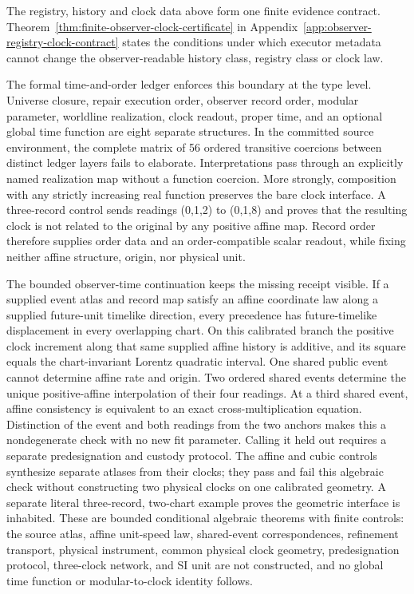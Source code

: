 \documentclass[11pt]{article}
\begin{document}
The registry, history and clock data above form one finite evidence contract.
Theorem~\ref{thm:finite-observer-clock-certificate} in
Appendix~\ref{app:observer-registry-clock-contract} states the conditions under
which executor metadata cannot change the observer-readable history class,
registry class or clock law.

The formal time-and-order ledger enforces this boundary at the type level.
Universe closure, repair execution order, observer record order, modular
parameter, worldline realization, clock readout, proper time, and an optional
global time function are eight separate structures. In the committed source
environment, the complete matrix of 56 ordered transitive coercions between
distinct ledger layers fails to elaborate. Interpretations pass through an
explicitly named realization map without a function coercion. More strongly,
composition with any strictly increasing real function preserves the bare
clock interface. A three-record control sends readings (0,1,2) to
(0,1,8) and proves that the resulting clock is not related to the original
by any positive affine map. Record order therefore supplies order data and an
order-compatible scalar readout, while fixing
neither affine structure, origin, nor physical unit.

The bounded observer-time continuation keeps the missing receipt visible. If a supplied
event atlas and record map satisfy an affine coordinate law along a supplied
future-unit timelike direction, every precedence has future-timelike
displacement in every overlapping chart. On this calibrated branch the
positive clock increment along that same supplied affine history is additive,
and its square equals the chart-invariant Lorentz quadratic interval. One
shared public event cannot determine affine rate and origin. Two ordered
shared events determine the unique positive-affine interpolation of their four
readings. At a third shared event, affine consistency is equivalent to an exact
cross-multiplication equation. Distinction of the event and both readings from
the two anchors makes this a nondegenerate check with no new fit parameter.
Calling it held out requires a separate predesignation and custody protocol.
The affine and cubic controls synthesize separate atlases from their clocks;
they pass and fail this algebraic check without constructing two physical
clocks on one calibrated geometry. A separate literal three-record, two-chart
example proves the geometric interface is inhabited. These are bounded
conditional algebraic theorems with finite controls: the source atlas, affine
unit-speed law, shared-event correspondences, refinement transport, physical
instrument, common physical clock geometry, predesignation protocol,
three-clock network, and SI unit are not constructed, and no global time
function or modular-to-clock identity follows.
\end{document}
